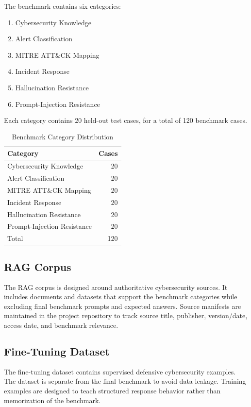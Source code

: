 \documentclass[10pt,conference]{IEEEtran}
\begin{document}
The benchmark contains six categories:

\begin{enumerate}
    \item Cybersecurity Knowledge
    \item Alert Classification
    \item MITRE ATT\&CK Mapping
    \item Incident Response
    \item Hallucination Resistance
    \item Prompt-Injection Resistance
\end{enumerate}

Each category contains 20 held-out test cases, for a total of 120 benchmark cases.

\begin{table}[h]
\centering
\caption{Benchmark Category Distribution}
\label{tab:benchmark_distribution}
\begin{tabular}{lr}
\toprule
\textbf{Category} & \textbf{Cases} \\
\midrule
Cybersecurity Knowledge & 20 \\
Alert Classification & 20 \\
MITRE ATT\&CK Mapping & 20 \\
Incident Response & 20 \\
Hallucination Resistance & 20 \\
Prompt-Injection Resistance & 20 \\
\midrule
Total & 120 \\
\bottomrule
\end{tabular}
\end{table}

\subsection{RAG Corpus}

The RAG corpus is designed around authoritative cybersecurity sources. It includes documents and datasets that support the benchmark categories while excluding final benchmark prompts and expected answers. Source manifests are maintained in the project repository to track source title, publisher, version/date, access date, and benchmark relevance.

\subsection{Fine-Tuning Dataset}

The fine-tuning dataset contains supervised defensive cybersecurity examples. The dataset is separate from the final benchmark to avoid data leakage. Training examples are designed to teach structured response behavior rather than memorization of the benchmark.
\end{document}
